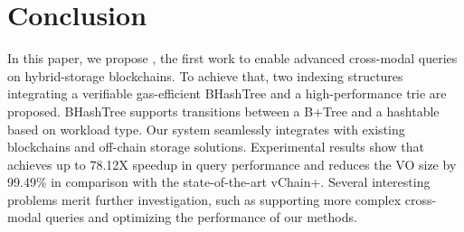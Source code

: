 \section{Conclusion}
\label{sec:conclusion}

\noindent In this paper, we propose \Chain, the first work to enable advanced cross-modal queries on hybrid-storage blockchains. 
To achieve that, two indexing structures integrating a verifiable gas-efficient BHashTree and a high-performance trie are proposed. 
BHashTree supports transitions between a B\(+\)Tree and a hashtable based on workload type. 
Our system seamlessly integrates with existing blockchains and off-chain storage solutions. 
Experimental results show that \Chain achieves up to 78.12X speedup in query performance and reduces the VO size by 99.49\% in comparison with the state-of-the-art vChain+.
Several interesting problems merit further investigation, such as supporting more complex cross-modal queries and optimizing the performance of our methods.